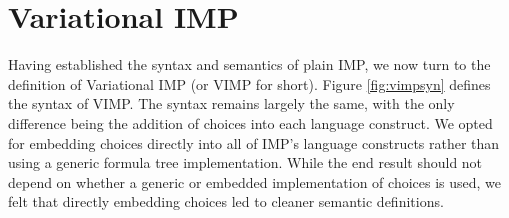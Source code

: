 \documentclass[onehalf,11pt]{beavtex}
\begin{document}
\chapter{Variational IMP}
\label{ch:vimp}

Having established the syntax and semantics of plain IMP, we now turn to the definition of Variational IMP (or VIMP for short).
Figure \ref{fig:vimpsyn} defines the syntax of VIMP. The syntax remains largely the same, with the only difference being the
addition of choices into each language construct. We opted for embedding choices directly into all of IMP's language constructs rather than using
a generic formula tree implementation. While the end result should not depend on whether a generic or embedded implementation of choices is
used, we felt that directly embedding choices led to cleaner semantic definitions.
\end{document}
